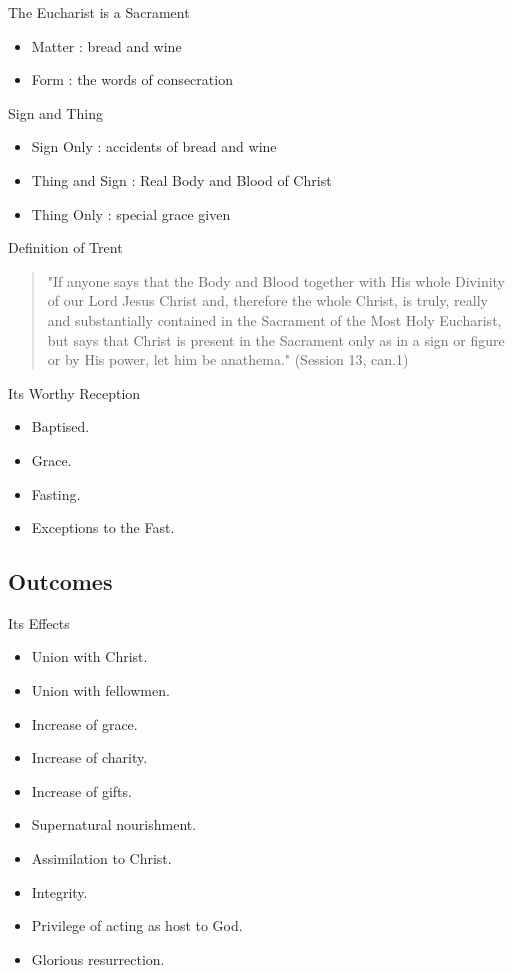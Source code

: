 \documentclass{beamer}
\begin{document}
\begin{frame}{The Eucharist is a Sacrament}
\begin{itemize}
\item Matter : bread and wine
\item Form : the words of consecration
\end{itemize}
\end{frame}
\begin{frame}{Sign and Thing}
\begin{itemize}
\item Sign Only : accidents of bread and wine
\item Thing and Sign : Real Body and Blood of Christ
\item Thing Only : special grace given
\end{itemize}
\end{frame}
\begin{frame}{Definition of Trent}
\begin{quote}
"If anyone says that the Body and Blood together with His whole Divinity of our Lord Jesus Christ and, therefore the whole Christ, is truly, really and substantially contained in the Sacrament of the Most Holy Eucharist, but says that Christ is present in the Sacrament only as in a sign or figure or by His power, let him be anathema." (Session 13, can.1)
\end{quote}
\end{frame}

\begin{frame}{Its Worthy Reception}
\begin{itemize}
\item Baptised.
\item Grace.
\item Fasting.
\item Exceptions to the Fast.
\end{itemize}
\end{frame}

\subsection{Outcomes}

\begin{frame}{Its Effects}
\begin{itemize}
\item Union with Christ.
\item Union with fellowmen. 
\item Increase of grace.
\item Increase of charity. 
\item Increase of gifts. 
\item Supernatural nourishment. 
\item Assimilation to Christ.
\item Integrity.
\item Privilege of acting as host to God.
\item Glorious resurrection.
\end{itemize}
\end{frame}
\end{document}
